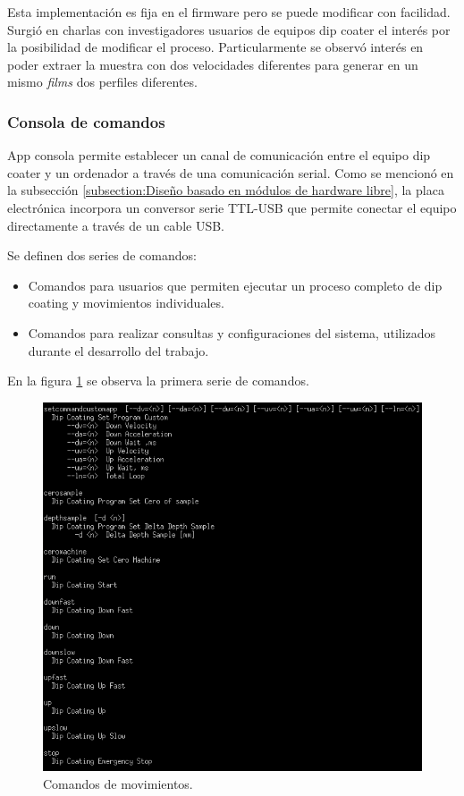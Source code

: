 Esta implementación es fija en el firmware pero se puede modificar con facilidad. Surgió en charlas con investigadores usuarios de equipos dip coater el interés por la posibilidad de modificar el proceso. Particularmente se observó interés en poder extraer la muestra con dos velocidades diferentes para generar en un mismo \textit{films} dos perfiles diferentes.


\subsubsection{Consola de comandos}
\label{sec:consola_comandos}

App consola permite establecer un canal de comunicación entre el equipo dip coater y un ordenador a través de una comunicación serial. Como se mencionó en la subsección \ref{subsection:Diseño basado en módulos de hardware libre}, la placa electrónica incorpora un conversor serie TTL-USB que permite conectar el  equipo directamente a través de un cable USB. 

Se definen dos series de comandos:
\begin{itemize}
\item Comandos para usuarios que permiten ejecutar un proceso completo de dip coating y movimientos individuales.
\item Comandos para realizar consultas y configuraciones del sistema, utilizados durante el desarrollo del trabajo.
\end{itemize}

En la figura \ref{fig:consola_movimientos} se observa la primera serie de comandos. 
\begin{figure}[h!]
	\centering
	\includegraphics[width=1\textwidth]{./Figures/consola_2.png}
	\caption{Comandos de movimientos.}
	\label{fig:consola_movimientos}
\end{figure}



